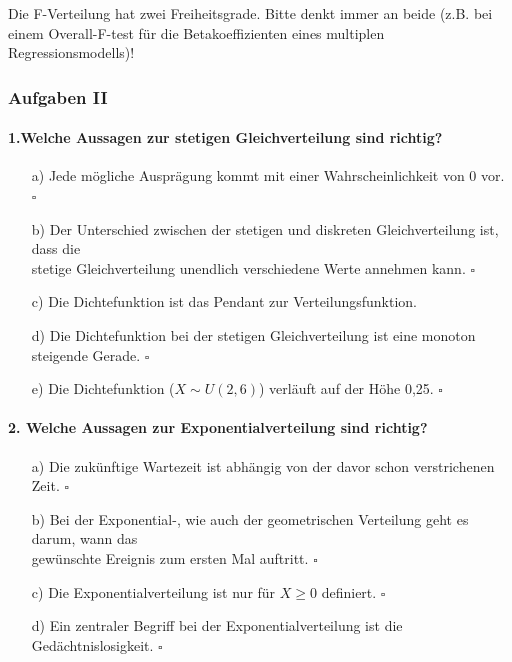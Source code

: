 \documentclass[a4paper]{article}
\newcommand\dangersign{%
 \makebox[1.8em][c]{%
 \makebox[0pt][c]{\raisebox{.15em}{\small!}}%
 \makebox[0pt][c]{\color{red}\Large$\triangle$}}}%
\begin{document}
\noindent \dangersign Die F-Verteilung hat zwei Freiheitsgrade. Bitte denkt immer an beide (z.B. bei einem Overall-F-test für die Betakoeffizienten eines multiplen Regressionsmodells)!\\

\noindent {}

\clearpage

\subsubsection{Aufgaben II}
\paragraph{1.Welche Aussagen zur stetigen Gleichverteilung sind richtig?}
\begin{itemize}
    \item[a)] Jede mögliche Ausprägung kommt mit einer Wahrscheinlichkeit von 0 vor. \hfill $\square$
    \item[b)] Der Unterschied zwischen der stetigen und diskreten Gleichverteilung ist, dass die\\ stetige Gleichverteilung unendlich verschiedene Werte annehmen kann. \hfill $\square$
    \item[c)] Die Dichtefunktion ist das Pendant zur Verteilungsfunktion.
    \item[d)] Die Dichtefunktion bei der stetigen Gleichverteilung ist eine monoton steigende Gerade. \hfill $\square$
    \item[e)] Die Dichtefunktion ($X \sim U(2,6)$) verläuft auf der Höhe 0,25. \hfill $\square$
\end{itemize}

\paragraph{2. Welche Aussagen zur Exponentialverteilung sind richtig?}
\begin{itemize}
    \item[a)] Die zukünftige Wartezeit ist abhängig von der davor schon verstrichenen Zeit. \hfill $\square$
    \item[b)] Bei der Exponential-, wie auch der geometrischen Verteilung geht es darum, wann das\\ gewünschte Ereignis zum ersten Mal auftritt. \hfill $\square$
    \item[c)] Die Exponentialverteilung ist nur für $X \geq 0$ definiert. \hfill $\square$
    \item[d)] Ein zentraler Begriff bei der Exponentialverteilung ist die Gedächtnislosigkeit. \hfill $\square$
\end{itemize}
\end{document}

